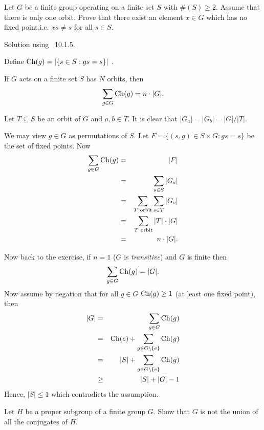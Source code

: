 \documentclass[12pt]{book}
\newcommand{\eG}{\ensuremath{\{e\}}}
\def\Ch{\mathop{\rm Ch}\nolimits}
\newcounter{myenumi}
\newenvironment{myenumerate}
{\begin{enumerate}
 \setcounter{enumi}{\themyenumi}
}
{\setcounter{myenumi}{\theenumi}
 \end{enumerate}}
\begin{document}
\begin{myenumerate}
\begin{excopy}
\label{gop:nofix}
Let $G$ be a finite group operating on a finite set $S$ with \(\#(S)\geq2\).
Assume that there is only one orbit. Prove that there exist an element
\(x\in G\) which has no fixed point,i.e. \(xs\neq s\) for all \(s\in S\).
\end{excopy}

Solution using \cite{Scott87}~10.1.5.

Define \(\Ch(g) = |\{s\in S: gs=s\}|\)  \label{def:Ch}.
\begin{llem}
If $G$ acts on a finite set $S$ has $N$ orbits, then
\begin{equation}
\sum_{g\in G} \Ch(g) = n\cdot |G|.
\end{equation}
\end{llem}

Let \(T\subseteq S\) be an orbit of $G$ and \(a,b\in T\).
It is clear that \(|G_a| = |G_b| = |G|/|T|\).

We may view \(g\in G\) as permutations of $S$.
Let \(F = \{(s,g)\in S\times G: gs=s\}\) be the set of fixed points.
Now
\begin{eqnarray}
\sum_{g\in G} \Ch(g) & = & |F|\\
 & = & \sum_{s\in S} |G_s| \\
 & = & \sum_{T\ \textrm{orbit}} \sum_{s\in T} |G_s| \\
 & = & \sum_{T\ \textrm{orbit}} |T|\cdot|G|\\
 & = & n\cdot|G|.
\end{eqnarray}

Now back to the exercise, if \(n=1\)
($G$ is \emph{transitive})
and $G$ is finite then
\begin{eqnarray}
\sum_{g\in G} \Ch(g) = |G|.
\end{eqnarray}
Now assume by negation that for all \(g\in G\) \(\Ch(g)\geq 1\)
(at least one fixed point), then
\begin{eqnarray*}
|G| & = & \sum_{g\in G} \Ch(g) \\
    & = & \Ch(e) + \sum_{g\in G\setminus\eG} \Ch(g) \\
    & = & |S| + \sum_{g\in G\setminus\eG} \Ch(g) \\
    & \geq & |S| + |G| - 1
\end{eqnarray*}
Hence, \(|S| \leq 1\) which contradicts the assumption.

\begin{excopy}
Let $H$ be a proper subgroup of a finite group $G$. Show that $G$
is not the union of all the conjugates of $H$.
\end{excopy}


\end{myenumerate}
\end{document}
